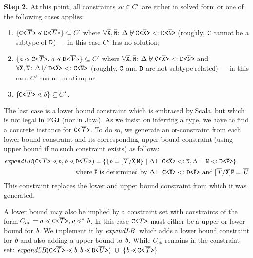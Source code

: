 \textbf{Step 2.} At this point, all
constraints $ \textit{sc} \in C'$ are either in solved form or one of the following
cases applies:
\begin{enumerate}
\item $\{ \mathtt{C \texttt{<} \overline{\mathit{T}} \texttt{>} } \lessdot \mathtt{D \texttt{<} \overline{\mathit{U}} \texttt{>} } \}
  \subseteq C'$ where $\forall\overline{\tt X},\overline{\tt N}\colon \Delta \not\vdash \mathtt{C \texttt{<} \overline{\tt X} \texttt{>} } <:
  \mathtt{D \texttt{<} \overline{\tt N} \texttt{>} }$ (roughly, ${\tt C}$ cannot be a subtype of ${\tt D}$) --- in this case $C'$ has no solution;
\item $\{ \mathit{ a } \lessdot \mathtt{C \texttt{<} \overline{\mathit{T}} \texttt{>} }, \mathit{ a } \lessdot
    \mathtt{D \texttt{<} \overline{\mathit{V}} \texttt{>} } \} \subseteq C'$ where
  $\forall\overline{\tt X},\overline{\tt N}\colon \Delta \not\vdash \mathtt{C \texttt{<} \overline{\tt X} \texttt{>} } <:
  \mathtt{D \texttt{<} \overline{\tt N} \texttt{>} } $ and $\forall\overline{\tt X},\overline{\tt N}\colon \Delta \not\vdash \mathtt{D \texttt{<} \overline{\tt X} \texttt{>} } <:
  \mathtt{C \texttt{<} \overline{\tt N} \texttt{>} }$ (roughly, ${\tt C}$ and ${\tt D}$ are not
  subtype-related) --- in this case $C'$ has no solution; or
\item $\{ \mathtt{C \texttt{<} \overline{\mathit{T}} \texttt{>} } \lessdot \mathit{ b } \} \subseteq C'$.
\end{enumerate}
The last case is a lower bound constraint which is embraced by Scala,
but which is not legal in FGJ (nor in Java). As we insist on inferring
a type, we have to find a concrete instance for
$\mathtt{C \texttt{<} \overline{\mathit{T}} \texttt{>} }$. To do so, we generate an or-constraint from
each lower bound constraint and its corresponding upper bound constraint (using upper bound  if no such constraint exists) as follows:
\begin{align*}
  \textit{expandLB} (\mathtt{C \texttt{<} \overline{\mathit{T}} \texttt{>} } \lessdot \mathit{ b }, \mathit{ b } \lessdot \mathtt{D \texttt{<} \overline{\mathit{U}} \texttt{>} })
  & = \{  \{  \mathit{ b } \doteq [\overline{\mathit{T}}/\overline{\tt X}]\texttt{N}  \} \mid
    \Delta \vdash \mathtt{C \texttt{<} \overline{\texttt{X}} \texttt{>} } <: \texttt{N},
    \Delta \vdash \texttt{N} <:  \mathtt{D \texttt{<} \overline{P} \texttt{>} } \}
  \\ \text{where }&\overline{\tt P}\text{ is determined by }\Delta \vdash \mathtt{C \texttt{<} \overline{\texttt{X}} \texttt{>} } <: \mathtt{D \texttt{<} \overline{\tt P} \texttt{>} } \text{ and
  } [\overline{\mathit{T}}/\overline{\tt X}]\overline{\tt P} = \overline{\mathit{U}}
\end{align*}
This constraint replaces the lower and upper bound constraint from which it was generated.

A lower bound may also be implied by a constraint set with constraints of the form
$C_{ab} = \mathit{ a } \lessdot \mathtt{C \texttt{<} \overline{\mathit{T}} \texttt{>} }, \mathit{ a } \lessdot^* \mathit{ b }$.
In this case $\mathtt{C \texttt{<} \overline{\mathit{T}} \texttt{>} }$ must either be a upper or lower bound for $\mathit{ b }$.
We implement it by $\textit{expandLB}$, which adds a lower bound constraint for $\mathit{ b }$
and also adding a upper bound to $\mathit{ b }$. While $C_{ab}$ remains in the constraint
set:
$\expandLB (\exptype{C}{\il{T}} \lessdot \tv{b}, \tv{b} \lessdot \exptype{D}{\il{U}})\ \cup \ 
\set{b \lessdot \exptype{C}{\il{T}}}$

